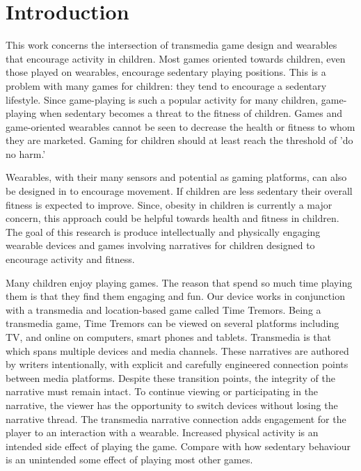 \documentclass{SIGCHI2015LaTex/sigchi}
\begin{document}


\section{Introduction}
This work concerns the intersection of transmedia game design and wearables that encourage activity in children. Most games oriented towards children, even those played on wearables, encourage sedentary playing positions. This is a problem with many games for children: they tend to encourage a sedentary lifestyle. Since game-playing is such a popular activity for many children, game-playing when sedentary becomes a threat to the fitness of children. Games and game-oriented wearables cannot be seen to decrease the health or fitness to whom they are marketed. Gaming for children should at least reach the threshold of 'do no harm.'

Wearables, with their many sensors and potential as gaming platforms, can also be designed in to encourage movement. If children are less sedentary their overall fitness is expected to improve. Since, obesity in children is currently a major concern, this approach could be helpful towards health and fitness in children. The goal of this research is produce intellectually and physically engaging wearable devices and games involving narratives for children designed to encourage activity and fitness. 

Many children enjoy playing games. The reason that spend so much time playing them is that they find them engaging and fun. Our device works in conjunction with a transmedia and location-based game called Time Tremors. Being a transmedia game, Time Tremors can be viewed on several platforms including TV, and online on computers, smart phones and tablets. Transmedia is that which spans multiple devices and media channels. These narratives are authored by writers intentionally, with explicit and carefully engineered connection points between media platforms. Despite these transition points, the integrity of the narrative must remain intact. To continue viewing or participating in the narrative, the viewer has the opportunity to switch devices without losing the narrative thread. The transmedia narrative connection adds engagement for the player to an interaction with a wearable. Increased physical activity is an intended side effect of playing the game. Compare with how sedentary behaviour is an unintended some effect of playing most other games.
\end{document}
